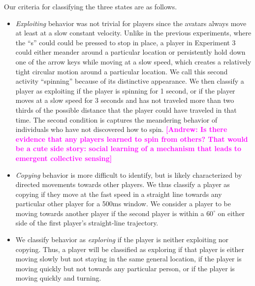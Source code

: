 \documentclass[12pt,letterpaper]{article}
\newcommand{\andrew}[1]{\textcolor{magenta}{\bf [Andrew: #1]}}
\begin{document}
Our criteria for classifying the three states are as follows.
\begin{itemize}
\item \emph{Exploiting} behavior was not trivial for players since the avatars always move at least at a slow constant velocity. 
Unlike in the previous experiments, where the ``s'' could could be pressed to stop in place, a player in Experiment 3 could either meander around a particular location or persistently hold down one of the arrow keys while moving at a slow speed, which creates a relatively tight circular motion around a particular location.  
We call this second activity ``spinning'' because of its distinctive appearance.  
We then classify a player as exploiting if the player is spinning for 1 second, or if the player moves at a slow speed for 3 seconds and has not traveled more than two thirds of the possible distance that the player could have traveled in that time.
The second condition is captures the meandering behavior of individuals who have not discovered how to spin. \andrew{Is there evidence that any players learned to spin from others? That would be a cute side story: social learning of a mechanism that leads to emergent collective sensing} 
\item \emph{Copying} behavior is more difficult to identify, but is likely characterized by directed movements towards other players. 
We thus classify a player as copying if they move at the fast speed in a straight line towards any particular other player for a 500ms window.
We consider a player to be moving towards another player if the second player is within a $60^\circ$ on either side of the first player's straight-line trajectory.
\item We classify behavior as \emph{exploring} if the player is neither exploiting nor copying. Thus, a player will be classified as exploring if that player is either moving slowly but not staying in the same general location, if the player is moving quickly but not towards any particular person, or if the player is moving quickly and turning.
\end{itemize}
\end{document}
